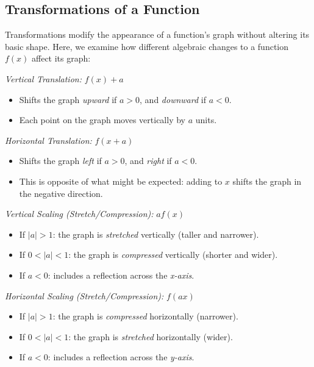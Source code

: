 \subsection{Transformations of a Function}

Transformations modify the appearance of a function's graph without altering its basic shape.
Here, we examine how different algebraic changes to a function \( f(x) \) affect its graph:
\vspace{\baselineskip}

\emph{Vertical Translation:} \( f(x) + a \)
	    
\begin{itemize}
	\item Shifts the graph \emph{upward} if \( a > 0 \), and \emph{downward} if \( a < 0 \).
	\item Each point on the graph moves vertically by \( a \) units.
\end{itemize}

\emph{Horizontal Translation:} \( f(x + a) \)

\begin{itemize}
	\item Shifts the graph \emph{left} if \( a > 0 \), and \emph{right} if \( a < 0 \).
	\item This is opposite of what might be expected: adding to \( x \) shifts the graph in the negative direction.
\end{itemize}

\emph{Vertical Scaling (Stretch/Compression):} \( a f(x) \)

\begin{itemize}
	\item If \( |a| > 1 \): the graph is \emph{stretched} vertically (taller and narrower).
	\item If \( 0 < |a| < 1 \): the graph is \emph{compressed} vertically (shorter and wider).
	\item If \( a < 0 \): includes a reflection across the \emph{x-axis}.
\end{itemize}

\emph{Horizontal Scaling (Stretch/Compression):} \( f(a x) \)

\begin{itemize}
	\item If \( |a| > 1 \): the graph is \emph{compressed} horizontally (narrower).
	\item If \( 0 < |a| < 1 \): the graph is \emph{stretched} horizontally (wider).
	\item If \( a < 0 \): includes a reflection across the \emph{y-axis}.
\end{itemize}

